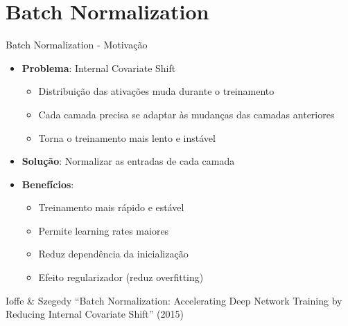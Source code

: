 \documentclass{beamer}
\begin{document}
\section{Batch Normalization}

\begin{frame}{Batch Normalization - Motivação}
\begin{itemize}
    \item \textbf{Problema}: Internal Covariate Shift
    \begin{itemize}
        \item Distribuição das ativações muda durante o treinamento
        \item Cada camada precisa se adaptar às mudanças das camadas anteriores
        \item Torna o treinamento mais lento e instável
    \end{itemize}
    \item \textbf{Solução}: Normalizar as entradas de cada camada
    \item \textbf{Benefícios}:
    \begin{itemize}
        \item Treinamento mais rápido e estável
        \item Permite learning rates maiores
        \item Reduz dependência da inicialização
        \item Efeito regularizador (reduz overfitting)
    \end{itemize}
\end{itemize}

\vspace{0.3cm}
\tiny{Ioffe \& Szegedy ``Batch Normalization: Accelerating Deep Network Training by Reducing Internal Covariate Shift'' (2015)}
\end{frame}
\end{document}

